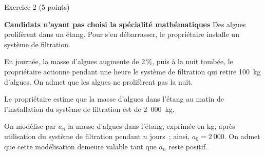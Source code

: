 
%
\begin{h2}Exercice 2 (5 points)\end{h2}
\textbf{Candidats n'ayant pas choisi la spécialité \og mathématiques \fg{}}
\medskip
Des algues prolifèrent dans un étang. Pour s'en débarrasser, le propriétaire installe
un système de filtration.
\par
En journée, la masse d'algues augmente de 2\,\%, puis à la nuit tombée, le propriétaire
actionne pendant une heure le système de filtration qui retire 1$00$~kg d'algues. On
admet que les algues ne prolifèrent pas la nuit.
\par
Le propriétaire estime que la masse d'algues dans l'étang au matin de l'installation
du système de filtration est de 2~000~kg.
\par
On modélise par $a_n$ la masse d'algues dans l'étang, exprimée en kg, après utilisation
du système de filtration pendant $n$ jours~; ainsi, $a_0 = 2~000$. On admet que cette
modélisation demeure valable tant que $a_n$ reste positif.
\bigskip
